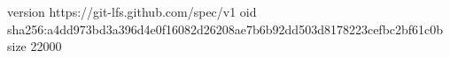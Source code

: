 version https://git-lfs.github.com/spec/v1
oid sha256:a4dd973bd3a396d4e0f16082d26208ae7b6b92dd503d8178223cefbc2bf61c0b
size 22000
